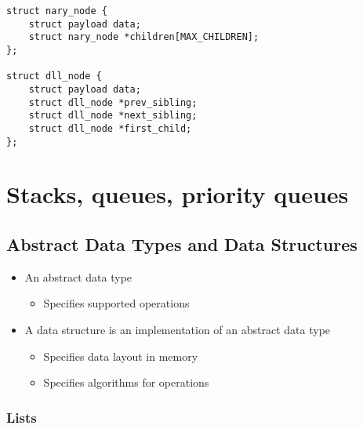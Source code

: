 \documentclass[12pt]{article}
\begin{document}
\begin{lstlisting}
struct nary_node {
    struct payload data;
    struct nary_node *children[MAX_CHILDREN];
};

struct dll_node {
    struct payload data;
    struct dll_node *prev_sibling;
    struct dll_node *next_sibling;
    struct dll_node *first_child;
};
\end{lstlisting}






















\newpage
\section{Stacks, queues, priority queues}

\subsection{Abstract Data Types and Data Structures}

\begin{itemize}
    \item An abstract data type
    \begin{itemize}
        \item Specifies supported operations
    \end{itemize}
    \item A data structure is an implementation of an abstract data type
    \begin{itemize}
        \item Specifies data layout in memory
        \item Specifies algorithms for operations
    \end{itemize}
\end{itemize}

\subsubsection{Lists}
\end{document}

